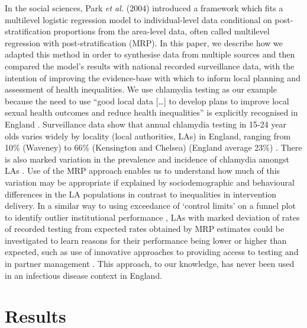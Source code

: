 \documentclass[fleqn,10pt]{wlscirep}
\begin{document}
In the social sciences, Park {\it et al.} (2004) \cite{Park2004} introduced a framework which fits a multilevel logistic regression model to individual-level data conditional on post-stratification proportions from the area-level data, often called multilevel regression with post-stratification (MRP). In this paper, we describe how we adapted this method \cite{Park2004} in order to synthesise data from multiple sources and then compared the model’s results with national recorded surveillance data, with the intention of improving the evidence-base with which to inform local planning and assessment of health inequalities. We use chlamydia testing as our example because the need to use “good local data […] to develop plans to improve local sexual health outcomes and reduce health inequalities” is explicitly recognised in England \cite{DepartmentofHealth2013}. Surveillance data show that annual chlamydia testing in 15-24 year olds varies widely by locality (local authorities, LAs) in England, ranging from 10\% (Waveney) to 66\% (Kensington and Chelsea) (England average 23\%) \cite{PublicHealthEngland2016}. There is also marked variation in the prevalence and incidence of chlamydia amongst LAs \cite{Lewis2017}. Use of the MRP approach enables us to understand how much of this variation may be appropriate if explained by sociodemographic and behavioural differences in the LA populations in contrast to inequalities in intervention delivery. In a similar way to using exceedance of ‘control limits’ on a funnel plot to identify outlier institutional performance \cite{Spiegelhalter2005}, LAs with marked deviation of rates of recorded testing from expected rates obtained by MRP estimates could be investigated to learn reasons for their performance being lower or higher than expected, such as use of innovative approaches to providing access to testing \cite{Estcourt2016} and in partner management \cite{Althaus2014}. This approach, to our knowledge, has never been used in an infectious disease context in England.


\section*{Results}
\end{document}
